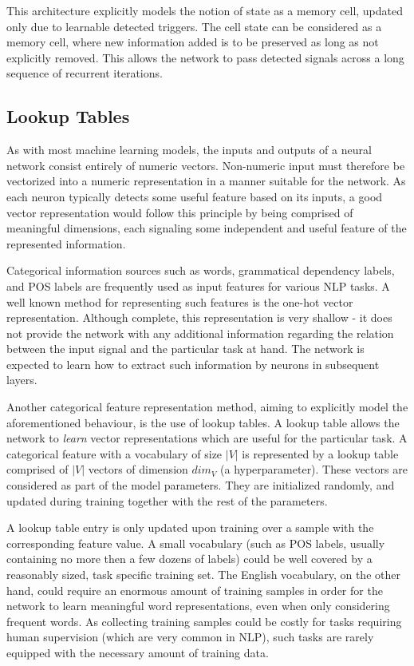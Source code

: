 This architecture explicitly models the notion of state as a memory cell, updated only due to learnable detected triggers. The cell state can be considered as a memory cell, where new information added is to be preserved as long as not explicitly removed. This allows the network to pass detected signals across a long sequence of recurrent iterations.  

\subsection{Lookup Tables} \label{section:lookuptables}

As with most machine learning models, the inputs and outputs of a neural network consist entirely of numeric vectors. Non-numeric input must therefore be vectorized into a numeric representation in a manner suitable for the network. As each neuron typically detects some useful feature based on its inputs, a good vector representation would follow this principle by being comprised of meaningful dimensions, each signaling some independent and useful feature of the represented information.  

Categorical information sources such as words, grammatical dependency labels, and POS labels are frequently used as input features for various NLP tasks. A well known method for representing such features is the one-hot vector representation. Although complete, this representation is very shallow - it does not provide the network with any additional information regarding the relation between the input signal and the particular task at hand. The network is expected to learn how to extract such information by neurons in subsequent layers.  

Another categorical feature representation method, aiming to explicitly model the aforementioned behaviour, is the use of lookup tables. A lookup table allows the network to \emph{learn} vector representations which are useful for the particular task. A categorical feature with a vocabulary of size $|V|$ is represented by a lookup table comprised of $|V|$ vectors of dimension $dim_V$ (a hyperparameter). These vectors are considered as part of the model parameters. They are initialized randomly, and updated during training together with the rest of the parameters.

A lookup table entry is only updated upon training over a sample with the corresponding feature value. A small vocabulary (such as POS labels, usually containing no more then a few dozens of labels) could be well covered by a reasonably sized, task specific training set. The English vocabulary, on the other hand, could require an enormous amount of training samples in order for the network to learn meaningful word representations, even when only considering frequent words. As collecting training samples could be costly for tasks requiring human supervision (which are very common in NLP), such tasks are rarely equipped with the necessary amount of training data. 

